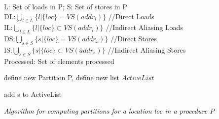 \begin{algorithm}[t]
{
\begin{scriptsize}
 L: Set of loads in P; S: Set of stores in P\\
 DL:$\bigcup_{l \in L}\{ l | \{loc\} = VS(addr_{l})\}$     //Direct Loads \\
 IL:$\bigcup_{l \in L}\{ l | \{loc\} \subset VS(addr_{l})\}$  //Indirect Aliasing Loads\\
 DS:$\bigcup_{s \in S}\{ s | \{loc\} = VS(addr_{s})\}$   //Direct Stores\\
 IS:$\bigcup_{s \in S}\{ s | \{loc\} \subset VS(addr_{s})\}$   //Indirect Aliasing Stores\\
 Processed: Set of elements processed

 {
 define new Partition P, define new list $ActiveList$

add s to ActiveList\\
 }
\end{scriptsize}
\caption {{{ \textit{Algorithm for computing partitions for a location \emph{loc} in a procedure P}}}}
\label{fig:algpartition}
}
\end{algorithm}
